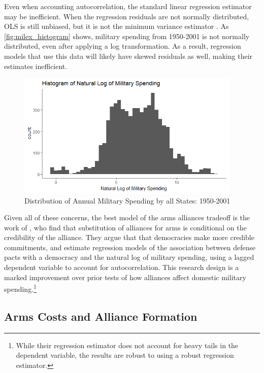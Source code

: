 \documentclass[12pt]{article}
\begin{document}
Even when accounting autocorrelation, the standard linear regression estimator may be inefficient. When the regression residuals are not normally distributed, OLS is still unbiased, but it is not the minimum variance estimator \citep{RaineyBaissa2017}. As \autoref{fig:milex_histogram} shows, military spending from 1950-2001 is not normally distributed, even after applying a log transformation. As a result, regression models that use this data will likely have skewed residuals as well, making their estimates inefficient. 

\begin{figure}
	\centering
		\includegraphics[width=0.95\textwidth]{milex_histogram.png}
	\caption{Distribution of Annual Military Spending by all States: 1950-2001}
	\label{fig:milex_histogram}
\end{figure}

Given all of these concerns, the best model of the arms alliances tradeoff is the work of \citet{DigiuseppePoast2016}, who find that substitution of alliances for arms is conditional on the credibility of the alliance. They argue that that democracies make more credible commitments, and estimate regression models of the association between defense pacts with a democracy and the natural log of military spending, using a lagged dependent variable to account for autocorrelation. This research design is a marked improvement over prior tests of how alliances affect domestic military spending.\footnote{While their regression estimator does not account for heavy tails in the dependent variable, the results are robust to using a robust regression estimator.} 
 

\subsection*{Arms Costs and Alliance Formation}
\end{document}

